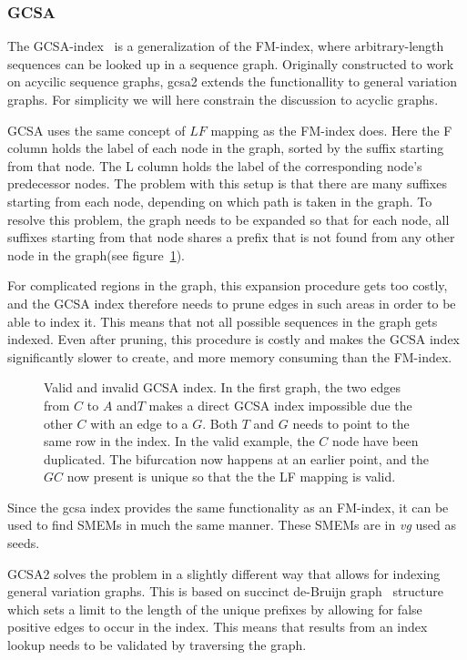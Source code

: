 \subsubsection{GCSA}
The GCSA-index~\cite{gcsa, gcsa2} is a generalization of the FM-index, where arbitrary-length sequences can be looked up in a sequence graph.
Originally constructed to work on acycilic sequence graphs, gcsa2 extends the functionallity to general variation graphs.
For simplicity we will here constrain the discussion to acyclic graphs.

GCSA uses the same concept of $LF$ mapping as the FM-index does. Here the F column holds the label of each node in the graph, sorted by the suffix starting from that node. The L column holds the label of the corresponding node's predecessor nodes. The problem with this setup is that there are many suffixes starting from each node, depending on which path is taken in the graph. To resolve this problem, the graph needs to be expanded so that for each node, all suffixes starting from that node shares a prefix that is not found from any other node in the graph(see figure~\ref{fig:gcsa}).

For complicated regions in the graph, this expansion procedure gets too costly, and the GCSA index therefore needs to prune edges in such areas in order to be able to index it. This means that not all possible sequences in the graph gets indexed. Even after pruning, this procedure is costly and makes the GCSA index significantly slower to create, and more memory consuming than the FM-index.

\begin{figure}
  \tikzpicture
  
  \endtikzpicture
  \label{fig:gcsa}
  \caption{
    Valid and invalid GCSA index.
    In the first graph, the two edges from $C$ to $A$ and$T$ makes a direct GCSA index impossible due the other $C$ with an edge to a $G$.
    Both $T$ and $G$ needs to point to the same row in the index.
    In the valid example, the $C$ node have been duplicated.
    The bifurcation now happens at an earlier point, and the $GC$ now present is unique so that the the LF mapping is valid.}
\end{figure}

Since the gcsa index provides the same functionality as an FM-index, it can be used to find SMEMs in much the same manner. These SMEMs are in \emph{vg} used as seeds. 

GCSA2 solves the problem in a slightly different way that allows for indexing general variation graphs.
This is based on succinct de-Bruijn graph~\cite{debruijn, succinctdebruijn} structure which sets a limit to the length of the unique prefixes by allowing for false positive edges to occur in the index.
This means that results from an index lookup needs to be validated by traversing the graph. 

